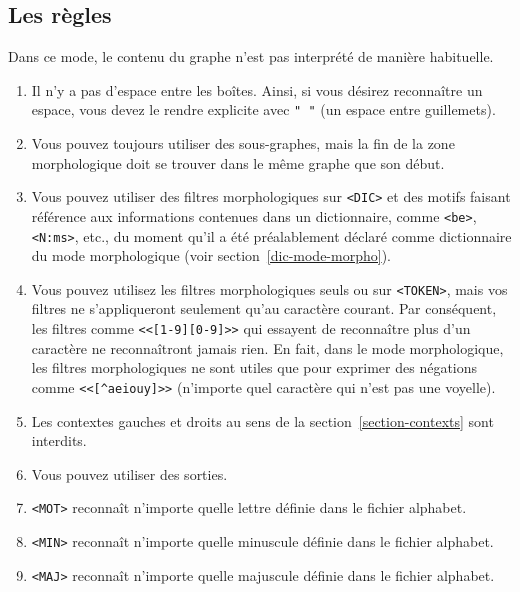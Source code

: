 \subsection{Les règles}
Dans ce mode, le contenu du graphe n'est pas interprété de manière habituelle.
\begin{enumerate}
\item Il n'y a pas d'espace entre les boîtes. Ainsi, si vous désirez reconnaître un espace,
	vous devez le rendre explicite avec \verb+" "+ (un espace entre guillemets).

\item Vous pouvez toujours utiliser des sous-graphes, mais la fin de la zone morphologique
	doit se trouver dans le même graphe que son début.

\item Vous pouvez utiliser des filtres morphologiques sur \verb+<DIC>+ et des motifs
faisant référence aux informations contenues dans un dictionnaire, comme \verb+<be>+, \verb+<N:ms>+, etc., du moment qu'il a été préalablement déclaré comme dictionnaire
du mode morphologique (voir section~\ref{dic-mode-morpho}). 
   
\item Vous pouvez utilisez les filtres morphologiques seuls ou sur \verb+<TOKEN>+,
	mais vos filtres ne s'appliqueront seulement qu'au caractère courant. Par 
	conséquent, les filtres comme \verb+<<[1-9][0-9]>>+ qui essayent de reconnaître plus d'un
	caractère ne reconnaîtront jamais rien. En fait, dans le mode morphologique, 
	les filtres morphologiques ne sont utiles que pour exprimer des négations
	comme \verb+<<[^aeiouy]>>+ (n'importe quel caractère qui n'est pas une voyelle). 
   
\item Les contextes gauches et droits au sens de la section~\ref{section-contexts} sont interdits.

\item Vous pouvez utiliser des sorties.
   
\item \verb+<MOT>+ reconnaît n'importe quelle lettre définie dans le fichier alphabet.

\item \verb+<MIN>+ reconnaît n'importe quelle minuscule définie dans le fichier alphabet.

\item \verb+<MAJ>+ reconnaît n'importe quelle majuscule définie dans le fichier alphabet.


\end{enumerate}

